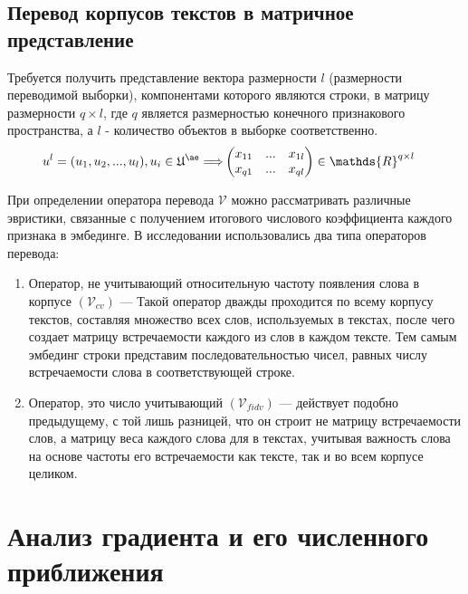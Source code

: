 \documentclass{article}
\begin{document}
    \subsection{Перевод корпусов текстов в матричное представление}
    \begin{leftrule}
        Требуется получить представление вектора размерности $l$ (размерности переводимой выборки), компонентами которого являются строки, в матрицу размерности $q \times l$, где $q$ является размерностью конечного признакового пространства, а $l$ - количество объектов в выборке соответственно. \\[-0.5in]
    
        \begin{align*}
            u^l = (u_1, u_2, ..., u_l), u_i \in \mathfrak{U}^{\ae} \Longrightarrow & 
            \begin{pmatrix}
                x_{11} & ... & x_{1l}\\
                x_{q1} & ... & x_{ql}
            \end{pmatrix} 
            \in \mathds{R}^{q \times l}
        \end{align*}
    \end{leftrule}

    При определении оператора перевода $\mathcal{V}$ можно рассматривать различные эвристики, связанные с получением итогового числового коэффициента каждого признака в эмбединге. В исследовании использовались два типа операторов перевода:

    \begin{enumerate}
        \item Оператор, не учитывающий относительную частоту появления слова в корпусе $(\mathcal{V}_{cv})$ — Такой оператор дважды проходится по всему корпусу текстов, составляя множество всех слов, используемых в текстах, после чего создает матрицу встречаемости каждого из слов в каждом тексте. Тем самым эмбединг строки представим последовательностью чисел, равных числу встречаемости слова в соответствующей строке.
        \item Оператор, это число учитывающий $(\mathcal{V}_{fidv})$ — действует подобно предыдущему, с той лишь разницей, что он строит не матрицу встречаемости слов, а матрицу веса каждого слова для в текстах, учитывая важность слова на основе частоты его встречаемости как тексте, так и во всем корпусе целиком.
    \end{enumerate}

\section{Анализ градиента  и его численного приближения}
\end{document}
